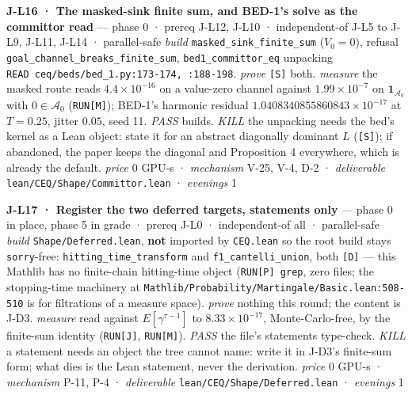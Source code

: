 \documentclass[11pt,a4paper]{article}
\theoremstyle{plain}
\theoremstyle{definition}
\theoremstyle{remark}
\begin{document}
\textbf{J-L16 · The masked-sink finite sum, and BED-1's solve as the
committor read} --- phase 0 · prereq J-L12, J-L10 · independent-of J-L5
to J-L9, J-L11, J-L14 · parallel-safe \emph{build}
\texttt{masked\_sink\_finite\_sum} (\(V_0=0\)), refusal
\texttt{goal\_channel\_breaks\_finite\_sum},
\texttt{bed1\_committor\_eq} unpacking
\texttt{READ\ ceq/beds/bed\_1.py:173-174,\ :188-198}. \emph{prove}
\texttt{{[}S{]}} both. \emph{measure} the masked route reads
\(4.4\times10^{-16}\) on a value-zero channel against
\(1.99\times10^{-7}\) on \(\mathbf 1_{\mathcal{A}_0}\) with
\(0\in\mathcal{A}_0\) (\texttt{RUN{[}M{]}}); BED-1's harmonic residual
\(1.0408340855860843\times10^{-17}\) at \(T=0.25\), jitter \(0.05\),
seed 11. \emph{PASS} builds. \emph{KILL} the unpacking needs the bed's
kernel as a Lean object: state it for an abstract diagonally dominant
\(L\) (\texttt{{[}S{]}}); if abandoned, the paper keeps the diagonal and
Proposition 4 everywhere, which is already the default. \emph{price}
\(0\) GPU-s · \emph{mechanism} V-25, V-4, D-2 · \emph{deliverable}
\texttt{lean/CEQ/Shape/Committor.lean} · \emph{evenings} 1

\textbf{J-L17 · Register the two deferred targets, statements only} ---
phase 0 in place, phase 5 in grade · prereq J-L0 · independent-of all ·
parallel-safe \emph{build} \texttt{Shape/Deferred.lean}, \textbf{not}
imported by \texttt{CEQ.lean} so the root build stays
\texttt{sorry}-free: \texttt{hitting\_time\_transform} and
\texttt{f1\_cantelli\_union}, both \texttt{{[}D{]}} --- this Mathlib has
no finite-chain hitting-time object (\texttt{RUN{[}P{]}\ grep}, zero
files; the stopping-time machinery at
\texttt{Mathlib/Probability/Martingale/Basic.lean:508-510} is for
filtrations of a measure space). \emph{prove} nothing this round; the
content is J-D3. \emph{measure} read against \(E[\gamma^{\tau-1}]\) to
\(8.33\times10^{-17}\), Monte-Carlo-free, by the finite-sum identity
(\texttt{RUN{[}J{]}}, \texttt{RUN{[}M{]}}). \emph{PASS} the file's
statements type-check. \emph{KILL} a statement needs an object the tree
cannot name: write it in J-D3's finite-sum form; what dies is the Lean
statement, never the derivation. \emph{price} \(0\) GPU-s ·
\emph{mechanism} P-11, P-4 · \emph{deliverable}
\texttt{lean/CEQ/Shape/Deferred.lean} · \emph{evenings} 1
\end{document}

